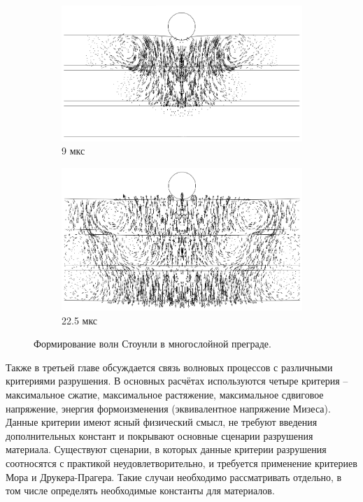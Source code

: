 \begin{figure}[ht]
\begin{subfigure}[b]{0.5\textwidth}
\centering
\includegraphics[width=\textwidth]{png/stounly-wave/01.png}
\caption{9 мкс}
\end{subfigure}
\begin{subfigure}[b]{0.5\textwidth}
\centering
\includegraphics[width=\textwidth]{png/stounly-wave/03.png}
\caption{22.5 мкс}
\end{subfigure}
\caption{Формирование волн Стоунли в многослойной преграде.}
\label{pic:stounly_wave}
\end{figure}

Также в третьей главе обсуждается связь волновых процессов с различными критериями разрушения. В основных расчётах используются четыре критерия -- максимальное сжатие, максимальное растяжение, максимальное сдвиговое напряжение, энергия формоизменения (эквивалентное напряжение Мизеса). Данные критерии имеют ясный физический смысл, не требуют введения дополнительных констант и покрывают основные сценарии разрушения материала. Существуют сценарии, в которых данные критерии разрушения соотносятся с практикой неудовлетворительно, и требуется применение критериев Мора и Друкера-Прагера. Такие случаи необходимо рассматривать отдельно, в том числе определять необходимые константы для материалов.

